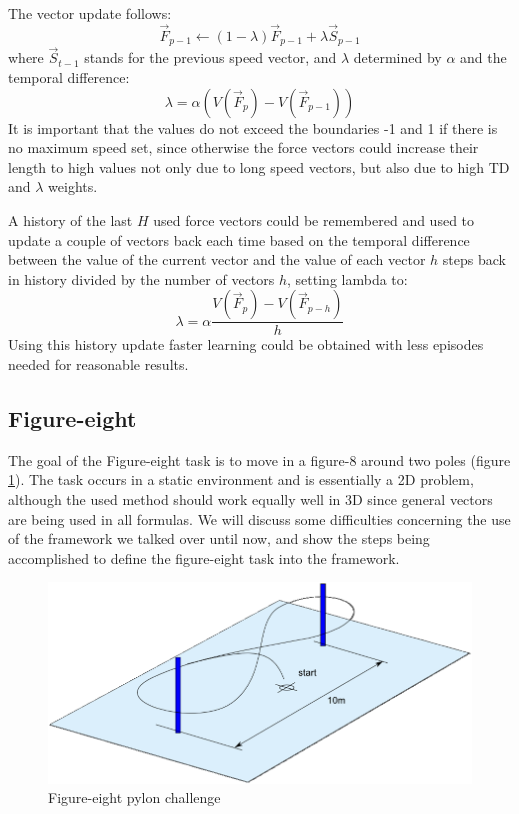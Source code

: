 \documentclass[11pt]{article}
\begin{document}
The vector update follows:
 \[ \vec{F}_{p-1} \leftarrow (1 - \lambda) \vec{F}_{p-1} + \lambda \vec{S}_{p-1} \]
where $\vec{S}_{t-1}$ stands for the previous speed vector, and $\lambda$ determined by $\alpha$ and the temporal difference:
 \[ \lambda = \alpha (V(\vec{F}_p) - V(\vec{F}_{p-1})) \]
 It is important that the values do not exceed the boundaries -1 and 1 if there is no maximum speed set, since otherwise the force vectors could increase their length to high values not only due to long speed vectors, but also due to high TD and $\lambda$ weights.
 

A history of the last $H$ used force vectors could be remembered and used to update a couple of vectors back each time based on the temporal difference between the value of the current vector and the value of each vector $h$ steps back in history divided by the number of vectors $h$, setting lambda to:
 \[ \lambda = \alpha \frac{ V(\vec{F}_p) - V(\vec{F}_{p-h}) }{ h } \]
Using this history update faster learning could be obtained with less episodes needed for reasonable results.


\subsection{Figure-eight}

The goal of the Figure-eight task is to move in a figure-8 around two poles (figure \ref{fig:pylonchallenge}). The task occurs in a static environment and is essentially a 2D problem, although the used method should work equally well in 3D since general vectors are being used in all formulas. We will discuss some difficulties concerning the use of the framework we talked over until now, and show the steps being accomplished to define the figure-eight task into the framework.

  \begin{figure}
    \includegraphics[width=1.0\textwidth]{img/imav2011_pylon}
    \caption{Figure-eight pylon challenge}
    \label{fig:pylonchallenge}
  \end{figure}
\end{document}
